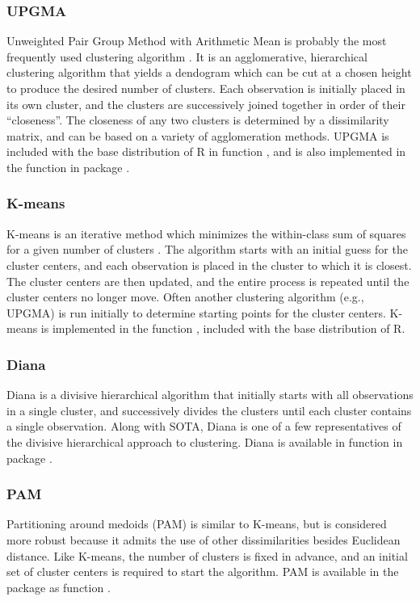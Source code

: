 \documentclass[11pt]{article}
\begin{document}

\subsubsection*{UPGMA}

Unweighted Pair Group Method with Arithmetic Mean is probably the most
frequently used clustering algorithm \citep{Kau1990}.   It is an agglomerative,
hierarchical clustering algorithm that yields a dendogram which can
be cut at a chosen height to produce the desired number of clusters.
Each observation is initially placed in its own cluster, and the clusters are
successively joined together in order of their ``closeness''.  The
closeness of any two clusters is determined by a dissimilarity
matrix, and can be based on a variety of agglomeration methods.  
UPGMA is included with the base distribution of R in function
, and is also implemented in the 
function in package .


\subsubsection*{K-means}
K-means is an iterative method which minimizes the within-class sum of
squares for a given number of clusters \citep{Har1979}.  The algorithm starts with an
initial guess for the cluster centers, and each observation is placed
in the cluster to which it is closest.  The cluster centers are then
updated, and the entire process is repeated until the cluster centers
no longer move.  Often another clustering algorithm (e.g., UPGMA) is run initially to
determine starting points for the cluster centers.  K-means is
implemented in the function , included with the base
distribution of R.
  
\subsubsection*{Diana}
Diana is a divisive hierarchical algorithm that initially starts with
all observations in a single cluster, and successively divides the
clusters until each cluster contains a single observation.  
Along with SOTA, Diana is one of a few representatives of the divisive hierarchical approach
to clustering.  Diana is available in function  in package .


\subsubsection*{PAM}
Partitioning around medoids (PAM) is similar to K-means, but is considered more
robust because it admits the use of other dissimilarities besides
Euclidean distance.  Like K-means, the number of clusters is fixed in
advance, and an initial set of cluster centers is required to start
the algorithm.  PAM is available in the  package as
function .
\end{document}
